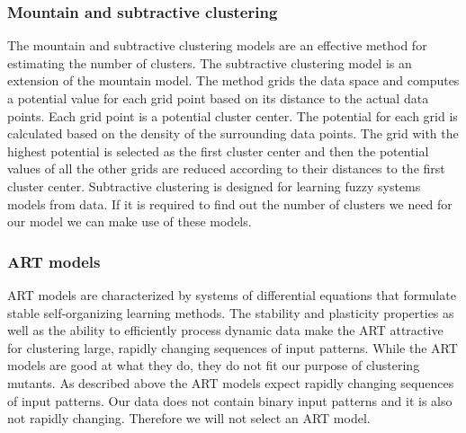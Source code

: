 \documentclass[../../main]{subfiles}
\begin{document}
\subsubsection{Mountain and subtractive clustering}
The mountain and subtractive clustering models are an effective method for estimating the number of clusters\cite{Du2010Clustering:Approach}. 
The subtractive clustering model is an extension of the mountain model\cite{Du2010Clustering:Approach}. 
\newline
The method grids the data space and computes a potential value for each grid point based on its distance to the actual data points. Each grid point is a potential cluster center. The potential for each grid is calculated based on the density of the surrounding data points. The grid with the highest potential is selected as the first cluster center and then the potential values of all the other grids are reduced according to their distances to the first cluster center.
\newline
Subtractive clustering is designed for learning fuzzy systems models from data\cite{Chiu1994FuzzyEstimation}. 
If it is required to find out the number of clusters we need for our model we can make use of these models.

\subsubsection{ART models}
ART models are characterized by systems of differential equations that formulate stable self-organizing learning methods\cite{Du2010Clustering:Approach}.
The stability and plasticity properties as well as the ability to efficiently process dynamic data make the ART attractive for clustering large, rapidly changing sequences of input patterns\cite{Du2010Clustering:Approach}.
While the ART models are good at what they do, they do not fit our purpose of clustering mutants.
As described above the ART models expect rapidly changing sequences of input patterns.
Our data does not contain binary input patterns and it is also not rapidly changing.
Therefore we will not select an ART model.
\end{document}
